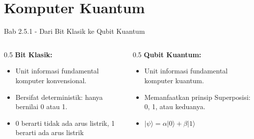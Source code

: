 \section{Komputer Kuantum}

\begin{frame}{Bab 2.5.1 - Dari Bit Klasik ke Qubit Kuantum}
    \begin{columns}
        \begin{column}{0.5\textwidth}
            \textbf{Bit Klasik:}
            \begin{itemize}
                \item Unit informasi fundamental komputer konvensional.
                \item Bersifat deterministik: hanya bernilai 0 atau 1.
                \item 0 berarti tidak ada arus listrik, 1 berarti ada arus listrik
            \end{itemize}
        \end{column}
        \begin{column}{0.5\textwidth}
            \textbf{Qubit Kuantum:}
            \begin{itemize}
                \item Unit informasi fundamental komputer kuantum.
                \item Memanfaatkan prinsip Superposisi: 0, 1, atau keduanya.
                \item $|\psi\rangle = \alpha|0\rangle + \beta|1\rangle$
            \end{itemize}
        \end{column}
    \end{columns}
\end{frame}

